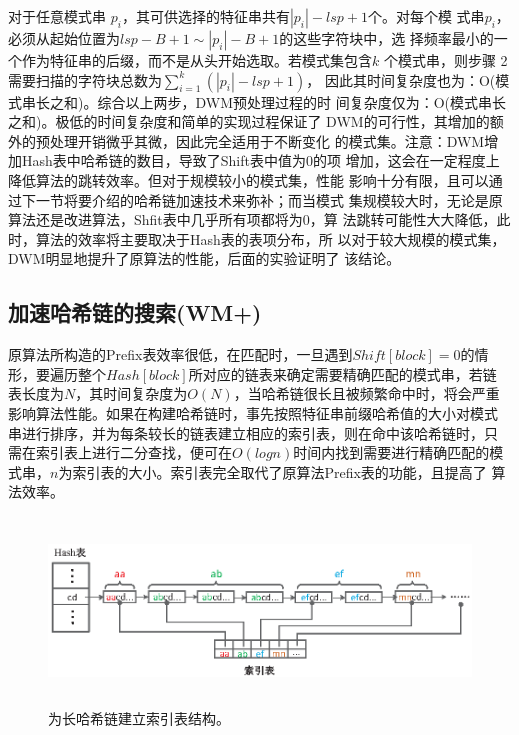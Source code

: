 对于任意模式串 $p_i$，其可供选择的特征串共有$|p_i|-lsp+1$个。对每个模
式串$p_i$，必须从起始位置为$lsp-B+1 \sim |p_i|-B+1$的这些字符块中，选
择频率最小的一个作为特征串的后缀，而不是从头开始选取。若模式集包含$k$
个模式串，则步骤 2需要扫描的字符块总数为$\sum_{i=1}^{k}(|p_i|-lsp+1)$，
因此其时间复杂度也为：O(模式串长之和)。综合以上两步，DWM预处理过程的时
间复杂度仅为：O(模式串长之和)。极低的时间复杂度和简单的实现过程保证了
DWM的可行性，其增加的额外的预处理开销微乎其微，因此完全适用于不断变化
的模式集。注意：DWM增加Hash表中哈希链的数目，导致了Shift表中值为0的项
增加，这会在一定程度上降低算法的跳转效率。但对于规模较小的模式集，性能
影响十分有限，且可以通过下一节将要介绍的哈希链加速技术来弥补；而当模式
集规模较大时，无论是原算法还是改进算法，Shfit表中几乎所有项都将为0，算
法跳转可能性大大降低，此时，算法的效率将主要取决于Hash表的表项分布，所
以对于较大规模的模式集，DWM明显地提升了原算法的性能，后面的实验证明了
该结论。

\subsection{加速哈希链的搜索(WM+)}
\label{sec:5_WM+}

原算法所构造的Prefix表效率很低，在匹配时，一旦遇到$Shift[block]=0$的情
形，要遍历整个$Hash[block]$所对应的链表来确定需要精确匹配的模式串，若链
表长度为$N$，其时间复杂度为$O(N)$，当哈希链很长且被频繁命中时，将会严重
影响算法性能。如果在构建哈希链时，事先按照特征串前缀哈希值的大小对模式
串进行排序，并为每条较长的链表建立相应的索引表，则在命中该哈希链时，只
需在索引表上进行二分查找，便可在$O(logn)$时间内找到需要进行精确匹配的模
式串，$n$为索引表的大小。索引表完全取代了原算法Prefix表的功能，且提高了
算法效率。

\begin{figure}[H]
  \centering
  \includegraphics[height=5cm ,width=12cm]{figures/5_WM/WM_index.eps}
  \caption{为长哈希链建立索引表结构。}
  \label{fig:WM_index}
\end{figure}

